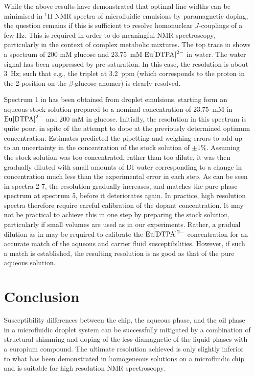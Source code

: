 While the above results have demonstrated that optimal line widths can be minimised in $^1$H NMR
spectra of microfluidic emulsions by paramagnetic doping,
the question remains if this is sufficient to resolve homonuclear
$J$-couplings of a few Hz. This is required in order to do meaningful NMR spectroscopy,
particularly in the context of complex metabolic mixtures.
The top trace in  shows a spectrum of 200 mM glucose
and 23.75~mM $\ce{Eu[DTPA]^{2-}}$ in water. The water signal has been suppressed by pre-saturation.
In this case, the resolution is about 3~Hz; such that e.g., the triplet at 3.2~ppm (which corresponds
to the proton in the 2-position on the $\beta$-glucose anomer) is clearly resolved.

Spectrum 1 in  has been obtained from
droplet emulsions, starting form an aqueous stock solution prepared to a nominal concentration
of 23.75~mM in $\ce{Eu[DTPA]^{2-}}$ and 200 mM in glucose.
Initially, the resolution in this spectrum is quite poor, in spite of
the attempt to dope at the previously determined optimum concentration. Estimates predicted
the pipetting and weighing errors to add up to an uncertainty in the concentration of the
stock solution of $\pm 1\%$.
Assuming the stock solution was too concentrated, rather than too dilute, it was
then gradually diluted with small amounts of DI water corresponding
to a change in concentration much less than the experimental error in each step.
As can be seen in spectra 2-7, the resolution gradually increases, and matches
the pure phase spectrum at spectrum 5, before it deteriorates again.
In practice, high resolution spectra therefore require careful calibration of the dopant
concentration. It may not be practical to achieve this in one step by preparing the stock
solution, particularly if small volumes are used as in our
experiments. Rather, a gradual dilution as in  may be required
to calibrate the $\ce{Eu[DTPA]^{2-}}$ concentration for an accurate match of
the aqueous and carrier fluid susceptibilities. However, if such a match is established,
the resulting resolution is as good as that of the pure aqueous solution.

\section{Conclusion}

Susceptibility differences between the chip,
the aqueous phase, and the oil phase in a microfluidic droplet system can
be successfully mitigated by a combination of structural shimming and
doping of the less diamagnetic of the liquid phases with a europium compound.
The ultimate resolution achieved is only slightly inferior to what has been
demonstrated in homogeneous solutions on a microfluidic chip and is suitable for high
resolution NMR spectroscopy.
